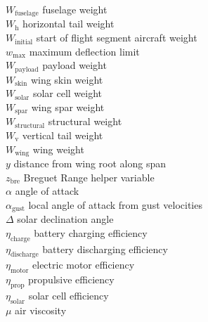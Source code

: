 \begin{multicols}{2}
\begin{tabbing}
$W_{\text{fuselage}}$ \> fuselage weight \\ %
$W_{\text{h}}$ \> horizontal tail weight \\ %
$W_{\text{initial}}$ \> start of flight segment aircraft weight \\ %
$w_{\text{max}}$ \> maximum deflection limit \\ %
$W_{\text{payload}}$ \> payload weight \\ %
$W_{\text{skin}}$ \> wing skin weight \\ %
$W_{\text{solar}}$ \> solar cell weight \\ %
$W_{\text{spar}}$ \> wing spar weight \\ %
$W_{\text{structural}}$ \> structural weight \\ %
$W_{\text{v}}$ \> vertical tail weight \\ %
$W_{\text{wing}}$ \> wing weight \\ %
$y$ \> distance from wing root along span \\ %
$z_{\text{bre}}$ \> Breguet Range helper variable \\
$\alpha$ \> angle of attack \\
$\alpha_{\text{gust}}$ \> local angle of attack from gust velocities \\ %
$\Delta$ \> solar declination angle \\
$\eta_{\text{charge}}$ \> battery charging efficiency \\
$\eta_{\text{discharge}}$ \> battery discharging efficiency \\
$\eta_{\text{motor}}$ \> electric motor efficiency \\
$\eta_{\text{prop}}$ \> propulsive efficiency \\
$\eta_{\text{solar}}$ \> solar cell efficiency \\
$\mu$ \> air viscosity \\ %

\end{tabbing}
\end{multicols}
